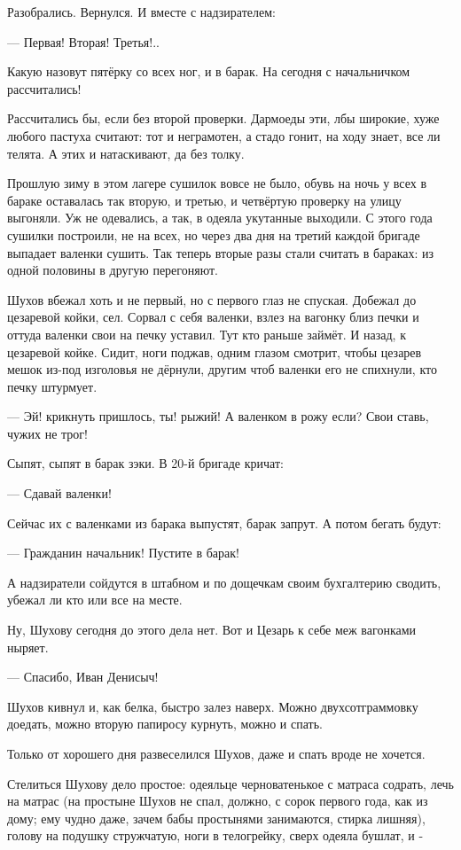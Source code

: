 Разобрались. Вернулся. И вместе с надзирателем:

--- Первая! Вторая! Третья!..

Какую назовут пятёрку \dash со всех ног, и в барак. На сегодня с начальничком рассчитались!

Рассчитались бы, если без второй проверки. Дармоеды эти, лбы широкие, хуже любого пастуха
считают: тот и неграмотен, а стадо гонит, на ходу знает, все ли телята. А этих и натаскивают, да
без толку.

Прошлую зиму в этом лагере сушилок вовсе не было, обувь на ночь у всех в бараке оставалась \dash
так вторую, и третью, и четвёртую проверку на улицу выгоняли. Уж не одевались, а так, в одеяла
укутанные выходили. С этого года сушилки построили, не на всех, но через два дня на третий
каждой бригаде выпадает валенки сушить. Так теперь вторые разы стали считать в бараках: из
одной половины в другую перегоняют.

Шухов вбежал хоть и не первый, но с первого глаз не спуская. Добежал до цезаревой койки, сел.
Сорвал с себя валенки, взлез на вагонку близ печки и оттуда валенки свои на печку уставил.
Тут \dash кто раньше займёт. И \dash назад, к цезаревой койке. Сидит, ноги поджав, одним глазом
смотрит, чтобы цезарев мешок из-под изголовья не дёрнули, другим \dash чтоб валенки его не
спихнули, кто печку штурмует.

--- Эй! \dash крикнуть пришлось, \Dash ты! рыжий! А валенком в рожу если? Свои ставь, чужих не трог!

Сыпят, сыпят в барак зэки. В 20-й бригаде кричат:

--- Сдавай валенки!

Сейчас их с валенками из барака выпустят, барак запрут. А потом бегать будут:

--- Гражданин начальник! Пустите в барак!

А надзиратели сойдутся в штабном \dash и по дощечкам своим бухгалтерию сводить, убежал ли кто
или все на месте.

Ну, Шухову сегодня до этого дела нет. Вот и Цезарь к себе меж вагонками ныряет.

--- Спасибо, Иван Денисыч!

Шухов кивнул и, как белка, быстро залез наверх. Можно двухсотграммовку доедать, можно вторую
папиросу курнуть, можно и спать.

Только от хорошего дня развеселился Шухов, даже и спать вроде не хочется.

Стелиться Шухову дело простое: одеяльце черноватенькое с матраса содрать, лечь на матрас (на
простыне Шухов не спал, должно, с сорок первого года, как из дому; ему чудно даже, зачем бабы
простынями занимаются, стирка лишняя), голову \dash на подушку стружчатую, ноги \dash в телогрейку,
сверх одеяла \dash бушлат, и -

